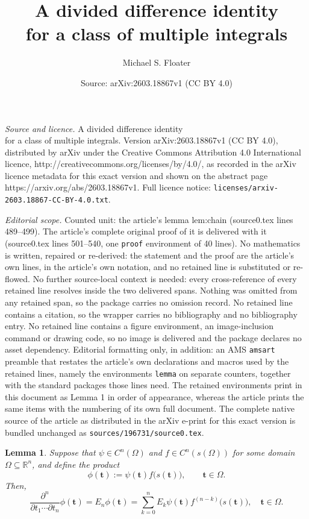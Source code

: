 \documentclass[10pt,a4paper]{amsart}
\title{A divided difference identity \\ for a class of multiple integrals}
\author{Michael S. Floater}
\date{Source: arXiv:2603.18867v1 (CC BY 4.0)}
\newtheorem{lemma}{Lemma}
\newcommand{\RR}{\mathbb{R}}
\def\bft{\mathbf{t}}
\begin{document}
\maketitle

\noindent\emph{Source and licence.} A divided difference identity \\ for a class of multiple integrals. Version arXiv:2603.18867v1 (CC BY 4.0), distributed by arXiv under the Creative Commons Attribution 4.0 International licence, http://creativecommons.org/licenses/by/4.0/, as recorded in the arXiv licence metadata for this exact version and shown on the abstract page https://arxiv.org/abs/2603.18867v1. Full licence notice: \texttt{licenses/arxiv-2603.18867-CC-BY-4.0.txt}.\par\smallskip

\noindent\textit{Editorial scope.} Counted unit: the article's lemma lem:chain (source0.tex lines 489--499). The article's complete original proof of it is delivered with it (source0.tex lines 501--540, one \texttt{proof} environment of 40 lines). No mathematics is written, repaired or re-derived: the statement and the proof are the article's own lines, in the article's own notation, and no retained line is substituted or re-flowed.  No further source-local context is needed: every cross-reference of every retained line resolves inside the two delivered spans.  Nothing was omitted from any retained span, so the package carries no omission record.  No retained line contains a citation, so the wrapper carries no bibliography and no bibliography entry.  No retained line contains a figure environment, an image-inclusion command or drawing code, so no image is delivered and the package declares no asset dependency.  Editorial formatting only, in addition: an AMS \texttt{amsart} preamble that restates the article's own declarations and macros used by the retained lines, namely the environments \texttt{lemma} on separate counters, together with the standard packages those lines need.  The retained environments print in this document as Lemma 1 in order of appearance, whereas the article prints the same items with the numbering of its own full document.  The complete native source of the article as distributed in the arXiv e-print for this exact version is bundled unchanged as \texttt{sources/196731/source0.tex}.
\begin{lemma}\label{lem:chain}
Suppose that $\psi \in C^n(\Omega)$ and $f \in C^n(s(\Omega))$
for some domain $\Omega \subseteq \RR^n$, and define the product
$$ \phi(\bft) := \psi(\bft)f\big(s(\bft)\big), \qquad \bft \in \Omega. $$
Then,
\begin{equation}\label{eq:Echain}
\frac{\partial^n}{\partial t_1 \cdots \partial t_n} \phi(\bft)
= E_n\phi(\bft)
= \sum_{k=0}^n E_k \psi(\bft) f^{(n-k)}\big(s(\bft)\big), \quad \bft \in \Omega.
\end{equation}
\end{lemma}
\end{document}
